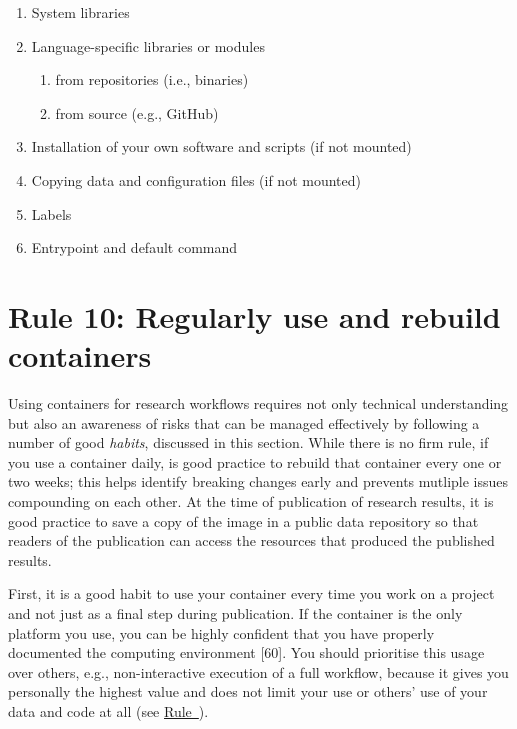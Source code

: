 \documentclass[10pt,letterpaper]{article}
\providecommand{\tightlist}{%
  \setlength{\itemsep}{0pt}\setlength{\parskip}{0pt}}
\begin{document}
\begin{enumerate}
\def\labelenumi{\arabic{enumi}.}
\tightlist
\item
  System libraries
\item
  Language-specific libraries or modules

  \begin{enumerate}
  \def\labelenumii{\arabic{enumii}.}
  \tightlist
  \item
    from repositories (i.e., binaries)
  \item
    from source (e.g., GitHub)
  \end{enumerate}
\item
  Installation of your own software and scripts (if not mounted)
\item
  Copying data and configuration files (if not mounted)
\item
  Labels
\item
  Entrypoint and default command
\end{enumerate}

\hypertarget{rule-10-regularly-use-and-rebuild-containers}{%
\section*{Rule 10: Regularly use and rebuild
containers}\label{rule-10-regularly-use-and-rebuild-containers}}

  \label{rule:usage} 

Using containers for research workflows requires not only technical
understanding but also an awareness of risks that can be managed
effectively by following a number of good \emph{habits}, discussed in
this section. While there is no firm rule, if you use a container daily,
is good practice to rebuild that container every one or two weeks; this
helps identify breaking changes early and prevents mutliple issues
compounding on each other. At the time of publication of research
results, it is good practice to save a copy of the image in a public
data repository so that readers of the publication can access the
resources that produced the published results.

First, it is a good habit to use your container every time you work on a
project and not just as a final step during publication. If the
container is the only platform you use, you can be highly confident that
you have properly documented the computing environment {[}60{]}. You
should prioritise this usage over others, e.g., non-interactive
execution of a full workflow, because it gives you personally the
highest value and does not limit your use or others' use of your data
and code at all (see
\hyperref[{rule:interactive}]{Rule~}).
\end{document}
